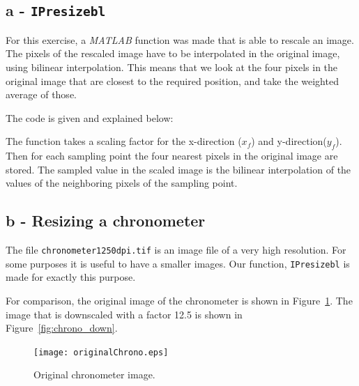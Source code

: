 \subsection*{a - \texttt{IPresizebl}}
For this exercise, a \textit{MATLAB} function was made that is able to rescale an image.
The pixels of the rescaled image have to be interpolated in the original image, using bilinear interpolation.
This means that we look at the four pixels in the original image that are closest to the required position, and take the weighted average of those.

The code is given and explained below:

The function takes a scaling factor for the x-direction ($x_f$) and y-direction($y_f$). Then for each sampling point the four nearest pixels in the original image are stored. The sampled value in the scaled image is the bilinear interpolation of the values of the neighboring pixels of the sampling point.
\subsection*{b - Resizing a chronometer}
The file \texttt{chronometer1250dpi.tif} is an image file of a very high resolution.
For some purposes it is useful to have a smaller images.
Our function, \texttt{IPresizebl} is made for exactly this purpose.

For comparison, the original image of the chronometer is shown in Figure~\ref{fig:chrono_original0}.
The image that is downscaled with a factor 12.5 is shown in Figure~\ref{fig:chrono_down}.

\begin{figure}[!Htb]
 \centering
 \texttt{[image: originalChrono.eps]}
 \caption{Original chronometer image.}
 \label{fig:chrono_original0}
\end{figure}

